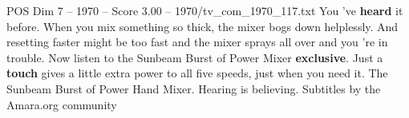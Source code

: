 \begin{textsample}{POS Dim 7 – 1970 – Score 3.00 – 1970/tv\_com\_1970\_117.txt}  \label{ex:f7_pos_031}
You 've \textbf{heard} it before.
When you mix something so thick, the mixer bogs down helplessly.
And resetting faster might be too fast and the mixer sprays all over and you 're in trouble.
Now listen to the Sunbeam Burst of Power Mixer \textbf{exclusive}.
Just a \textbf{touch} gives a little extra power to all five speeds, just when you need it.
The Sunbeam Burst of Power Hand Mixer.
Hearing is believing.
Subtitles by the Amara.org community

\end{textsample}
